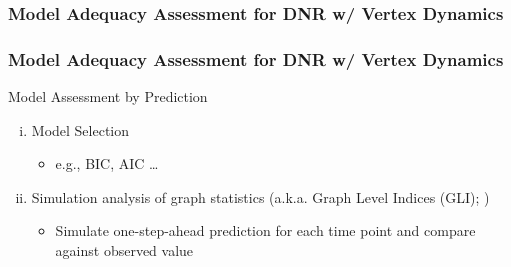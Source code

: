 \documentclass[10pt]{beamer}
\begin{document}
\subsubsection{Model Adequacy Assessment for DNR w/ Vertex Dynamics} 

\begin{frame}
\frametitle{Model Adequacy Assessment for DNR w/ Vertex Dynamics}


\begin{block}{Model Assessment by Prediction}
\begin{enumerate}[i)]
\item Model Selection

\begin{itemize}
\item e.g., BIC, AIC \dots
\end{itemize}

\item Simulation analysis of graph statistics (a.k.a. Graph Level Indices (GLI); \cite{hunter08})

\begin{itemize}
\item Simulate one-step-ahead prediction for each time point and compare against observed value
\end{itemize}

\end{enumerate}
\end{block}

\end{frame}
\end{document}
